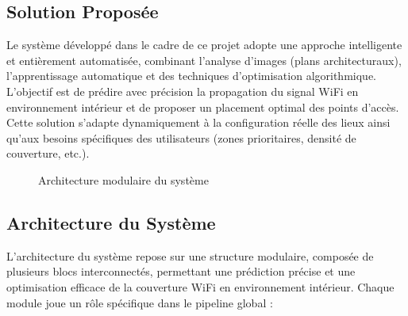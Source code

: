 \documentclass[12pt,a4paper]{article}
\begin{document}
\subsection{Solution Proposée}
Le système développé dans le cadre de ce projet adopte une approche intelligente et entièrement automatisée, combinant l’analyse d’images (plans architecturaux), l’apprentissage automatique et des techniques d’optimisation algorithmique. L’objectif est de prédire avec précision la propagation du signal WiFi en environnement intérieur et de proposer un placement optimal des points d’accès.
Cette solution s’adapte dynamiquement à la configuration réelle des lieux ainsi qu’aux besoins spécifiques des utilisateurs (zones prioritaires, densité de couverture, etc.).
\begin{figure}[H]
    \centering
    \caption{Architecture modulaire du système}
\end{figure} 

\subsection{Architecture du Système}
L’architecture du système repose sur une structure modulaire, composée de plusieurs blocs interconnectés, permettant une prédiction précise et une optimisation efficace de la couverture WiFi en environnement intérieur. Chaque module joue un rôle spécifique dans le pipeline global :
\end{document}
